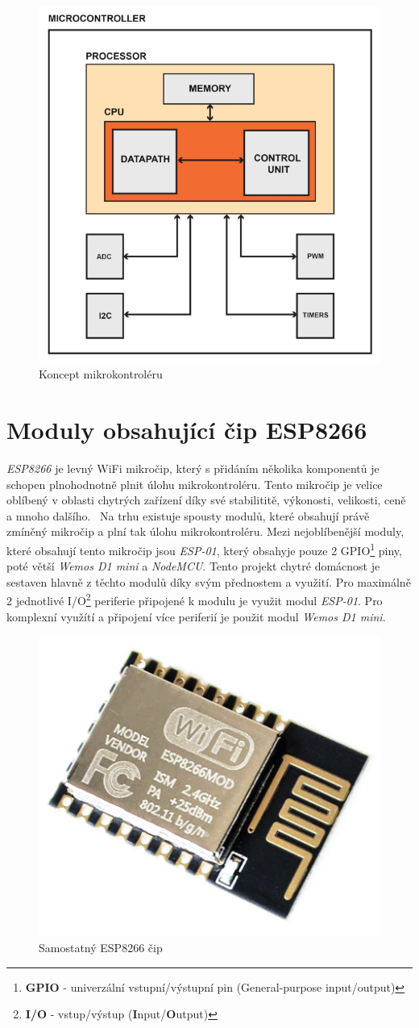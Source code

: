 \begin{figure}[hbt]
  \centering
  \includegraphics[width=.6 \linewidth]{obrazky-figures/mcu.jpeg}
  \caption{
    Koncept mikrokontroléru
  }
  \label{figure:mcu}
\end{figure}

\section{Moduly obsahující čip ESP8266}
\label{terminy:esp8266}

\emph{ESP8266} je levný WiFi mikročip, který s přidáním několika komponentů je schopen plnohodnotně plnit úlohu mikrokontroléru. Tento mikročip je velice oblíbený v oblasti chytrých zařízení díky své stabilititě, výkonosti, velikosti, ceně a mnoho dalšího.~\cite{wiki:esp}
Na trhu existuje spousty modulů, které obsahují právě zmíněný mikročip a plní tak úlohu mikrokontroléru. Mezi nejoblíbenější moduly, které obsahují tento mikročip jsou \emph{ESP-01}, který obsahyje pouze 2 GPIO\footnote{\textbf{GPIO} - univerzální vstupní/výstupní pin (General-purpose input/output)} piny, poté větší \emph{Wemos D1 mini} a \emph{NodeMCU}.
Tento projekt chytré domácnost je sestaven hlavně z těchto modulů díky svým přednostem a využití. Pro maximálně 2 jednotlivé I/O\footnote{\textbf{I/O} - vstup/výstup (\textbf{I}nput/\textbf{O}utput)} periferie připojené k modulu je využit modul \emph{ESP-01}. Pro komplexní využítí a připojení více periferií je použit modul \emph{Wemos D1 mini}.

\begin{figure}[hbt]
  \centering
  \includegraphics[width=.2 \linewidth]{obrazky-figures/esp_standalone.png}
  \caption{Samostatný ESP8266 čip}
  \label{figure:esp8266}
\end{figure}

